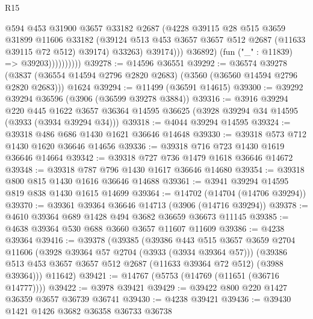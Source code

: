 \begin{lexlean}{R15}
\begin{coremodule}
                              @594
                              @453
                              @31900
                              @3657
                              @33182
                              @2687
                              (@4228
                                @39115
                                @28
                                @515
                                @3659
                                @31899
                                @11606
                                @33182
                                (@39124
                                  @513
                                  @453
                                  @3657
                                  @3657
                                  @512
                                  @2687
                                  (@11633 @39115 @72 @512)
                                  @39174)
                                @33263)
                              @39174)))
                        @36892)
                      (fun ("_" : @11839) => @39203))))))))))
@39278 := @14596 @36551
@39292 := @36574
    @39278
    (@3837 (@36554 @14594 @2796 @2820 @2683) (@3560 (@36560 @14594 @2796 @2820 @2683)))
    @1624
@39294 := @11499 (@36591 @14615)
@39300 := @39292 @39294 @36596 (@3906 (@36599 @39278 @3884))
@39316 := @3916
    @39294
    @220
    @445
    @1622
    @3657
    @36364
    @14595
    @36625
    (@3928 @39294 @34 @14595 (@3933 (@3934 @39294 @34)))
@39318 := @4044 @39294 @14595
@39324 := @39318 @486 @686 @1430 @1621 @36646 @14648
@39330 := @39318 @573 @712 @1430 @1620 @36646 @14656
@39336 := @39318 @716 @723 @1430 @1619 @36646 @14664
@39342 := @39318 @727 @736 @1479 @1618 @36646 @14672
@39348 := @39318 @787 @796 @1430 @1617 @36646 @14680
@39354 := @39318 @800 @815 @1430 @1616 @36646 @14688
@39361 := @3941 @39294 @14595 @819 @838 @1430 @1615 @14699
@39364 := @14702 (@14704 (@14706 @39294))
@39370 := @39361 @39364 @36646 @14713 (@3906 (@14716 @39294))
@39378 := @4610 @39364 @689 @1428 @494 @3682 @36659 @36673 @11145
@39385 := @4638 @39364 @530 @688 @3660 @3657 @11607 @11609
@39386 := @4238 @39364
@39416 := @39378
    (@39385
      (@39386
        @443
        @515
        @3657
        @3659
        @2704
        @11606
        (@3928 @39364 @57 @2704 (@3933 (@3934 @39364 @57)))
        (@39386 @513 @453 @3657 @3657 @512 @2687 (@11633 @39364 @72 @512) (@3988 @39364)))
      @11642)
@39421 := @14767 (@5753 (@14769 (@11651 (@36716 @14777))))
@39422 := @3978 @39421
@39429 := @39422 @800 @220 @1427 @36359 @3657 @36739 @36741
@39430 := @4238 @39421
@39436 := @39430 @1421 @1426 @3682 @36358 @36733 @36738

\end{coremodule}
\end{lexlean}
